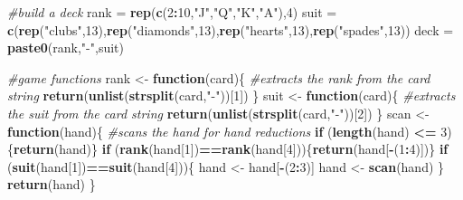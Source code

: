 \documentclass[
]{book}
\newenvironment{Shaded}{\begin{snugshade}}{\end{snugshade}}
\newcommand{\CommentTok}[1]{\textcolor[rgb]{0.56,0.35,0.01}{\textit{#1}}}
\newcommand{\ControlFlowTok}[1]{\textcolor[rgb]{0.13,0.29,0.53}{\textbf{#1}}}
\newcommand{\DecValTok}[1]{\textcolor[rgb]{0.00,0.00,0.81}{#1}}
\newcommand{\FunctionTok}[1]{\textcolor[rgb]{0.13,0.29,0.53}{\textbf{#1}}}
\newcommand{\NormalTok}[1]{#1}
\newcommand{\OtherTok}[1]{\textcolor[rgb]{0.56,0.35,0.01}{#1}}
\newcommand{\SpecialCharTok}[1]{\textcolor[rgb]{0.81,0.36,0.00}{\textbf{#1}}}
\newcommand{\StringTok}[1]{\textcolor[rgb]{0.31,0.60,0.02}{#1}}
\theoremstyle{definition}
\theoremstyle{definition}
\theoremstyle{definition}
\theoremstyle{definition}
\theoremstyle{remark}
\begin{document}
\begin{Shaded}
\begin{Highlighting}[]
\CommentTok{\#build a deck}
\NormalTok{rank }\OtherTok{=} \FunctionTok{rep}\NormalTok{(}\FunctionTok{c}\NormalTok{(}\DecValTok{2}\SpecialCharTok{:}\DecValTok{10}\NormalTok{,}\StringTok{"J"}\NormalTok{,}\StringTok{"Q"}\NormalTok{,}\StringTok{"K"}\NormalTok{,}\StringTok{"A"}\NormalTok{),}\DecValTok{4}\NormalTok{)}
\NormalTok{suit }\OtherTok{=} \FunctionTok{c}\NormalTok{(}\FunctionTok{rep}\NormalTok{(}\StringTok{"clubs"}\NormalTok{,}\DecValTok{13}\NormalTok{),}\FunctionTok{rep}\NormalTok{(}\StringTok{"diamonds"}\NormalTok{,}\DecValTok{13}\NormalTok{),}\FunctionTok{rep}\NormalTok{(}\StringTok{"hearts"}\NormalTok{,}\DecValTok{13}\NormalTok{),}\FunctionTok{rep}\NormalTok{(}\StringTok{"spades"}\NormalTok{,}\DecValTok{13}\NormalTok{))}
\NormalTok{deck }\OtherTok{=} \FunctionTok{paste0}\NormalTok{(rank,}\StringTok{"{-}"}\NormalTok{,suit)}

\CommentTok{\#game functions}
\NormalTok{rank }\OtherTok{\textless{}{-}} \ControlFlowTok{function}\NormalTok{(card)\{ }\CommentTok{\#extracts the rank from the card string}
  \FunctionTok{return}\NormalTok{(}\FunctionTok{unlist}\NormalTok{(}\FunctionTok{strsplit}\NormalTok{(card,}\StringTok{"{-}"}\NormalTok{))[}\DecValTok{1}\NormalTok{])}
\NormalTok{\}}
\NormalTok{suit }\OtherTok{\textless{}{-}} \ControlFlowTok{function}\NormalTok{(card)\{ }\CommentTok{\#extracts the suit from the card string}
  \FunctionTok{return}\NormalTok{(}\FunctionTok{unlist}\NormalTok{(}\FunctionTok{strsplit}\NormalTok{(card,}\StringTok{"{-}"}\NormalTok{))[}\DecValTok{2}\NormalTok{])}
\NormalTok{\}}
\NormalTok{scan }\OtherTok{\textless{}{-}} \ControlFlowTok{function}\NormalTok{(hand)\{ }\CommentTok{\#scans the hand for hand reductions}
  \ControlFlowTok{if}\NormalTok{ (}\FunctionTok{length}\NormalTok{(hand) }\SpecialCharTok{\textless{}=} \DecValTok{3}\NormalTok{)\{}\FunctionTok{return}\NormalTok{(hand)\}}
  \ControlFlowTok{if}\NormalTok{ (}\FunctionTok{rank}\NormalTok{(hand[}\DecValTok{1}\NormalTok{])}\SpecialCharTok{==}\FunctionTok{rank}\NormalTok{(hand[}\DecValTok{4}\NormalTok{]))\{}\FunctionTok{return}\NormalTok{(hand[}\SpecialCharTok{{-}}\NormalTok{(}\DecValTok{1}\SpecialCharTok{:}\DecValTok{4}\NormalTok{)])\}}
  \ControlFlowTok{if}\NormalTok{ (}\FunctionTok{suit}\NormalTok{(hand[}\DecValTok{1}\NormalTok{])}\SpecialCharTok{==}\FunctionTok{suit}\NormalTok{(hand[}\DecValTok{4}\NormalTok{]))\{}
\NormalTok{      hand }\OtherTok{\textless{}{-}}\NormalTok{ hand[}\SpecialCharTok{{-}}\NormalTok{(}\DecValTok{2}\SpecialCharTok{:}\DecValTok{3}\NormalTok{)]}
\NormalTok{      hand }\OtherTok{\textless{}{-}} \FunctionTok{scan}\NormalTok{(hand)}
\NormalTok{  \}}
  \FunctionTok{return}\NormalTok{(hand)}
\NormalTok{\}}


\end{Highlighting}
\end{Shaded}
\end{document}
